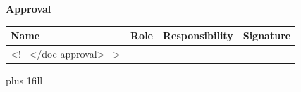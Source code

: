         

\begin{flushleft}
    \textcolor{AlabRed}{\textbf{Approval}}\\
\end{flushleft}
\vspace{1ex}

\begin{tabular}{ | p{}| p{}| p{}| p{}| } %
    \hline
    \rowcolor{AlabTableColLightBlue}
    \textbf{Name} & \textbf{Role} & \textbf{Responsibility} & \textbf{Signature} \\
    \hline
    <!-- </doc-approval> -->
    \hline
\end{tabular} %
\vspace{1ex}
\hbox{}\vskip 0cm plus 1fill
\pagebreak
